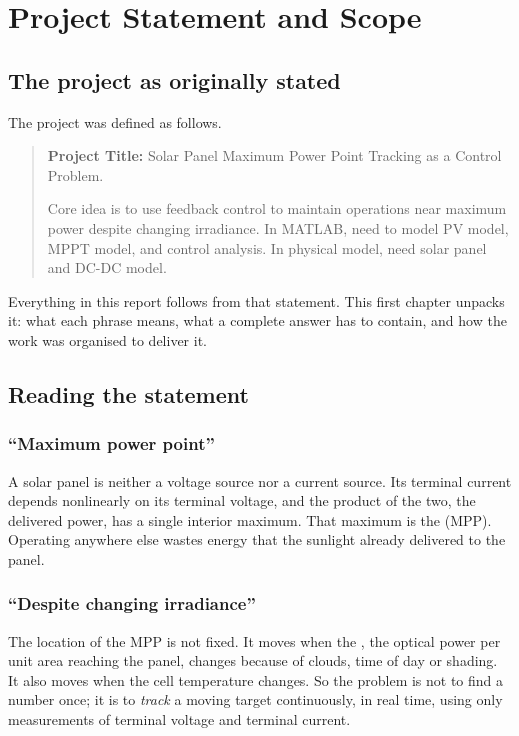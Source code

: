 \chapter{Project Statement and Scope}
\label{ch:statement}

\section{The project as originally stated}

The project was defined as follows.

\begin{quote}
\textbf{Project Title:} Solar Panel Maximum Power Point Tracking as a Control
Problem.

Core idea is to use feedback control to maintain operations near maximum power
despite changing irradiance. In MATLAB, need to model PV model, MPPT model, and
control analysis. In physical model, need solar panel and DC-DC model.
\end{quote}

Everything in this report follows from that statement. This first chapter
unpacks it: what each phrase means, what a complete answer has to contain, and
how the work was organised to deliver it.

\section{Reading the statement}

\subsection{``Maximum power point''}

A solar panel is neither a voltage source nor a current source. Its terminal
current depends nonlinearly on its terminal voltage, and the product of the two,
the delivered power, has a single interior maximum. That maximum is the
 (MPP). Operating anywhere else wastes energy that the
sunlight already delivered to the panel.

\subsection{``Despite changing irradiance''}

The location of the MPP is not fixed. It moves when the , the
optical power per unit area reaching the panel, changes because of clouds, time
of day or shading. It also moves when the cell temperature changes. So the
problem is not to find a number once; it is to \emph{track} a moving target
continuously, in real time, using only measurements of terminal voltage and
terminal current.

